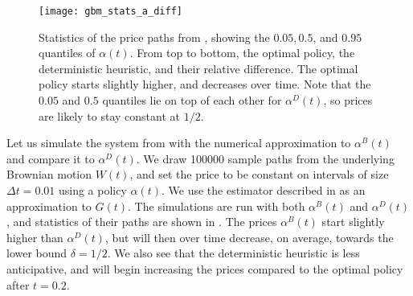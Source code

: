 \documentclass[main.tex]{subfiles}
\begin{document}
\begin{figure}[htb]
  \centering
  \texttt{[image: gbm\_stats\_a\_diff]}
  \caption[Statistics of the price paths from ]{Statistics of the price paths from
    , %
    showing the $0.05,0.5$, and
    $0.95$ quantiles of $\alpha(t)$. From top to bottom, the optimal
    policy, the deterministic heuristic, and their relative difference.
    The optimal policy starts slightly higher, and decreases over
    time.
    Note that the $0.05$ and $0.5$ quantiles lie on top of each
    other for $\alpha^D(t)$, so prices are likely to stay constant
    at $1/2$.
  }\label{fig:gbm_stats_a}
\end{figure}
\begin{example}\label{ex:impact_uncertainty}
  Let us simulate the system from
  with the numerical approximation to $\alpha^B(t)$ and compare it to $\alpha^D(t)$.
  We draw \num{100000} sample paths from the underlying Brownian
  motion $W(t)$, and set the price to be constant on intervals of size $\Delta t = 0.01$
  using a policy $\alpha(t)$. We use the estimator described in
   as an approximation to $G(t)$.
  The simulations are run with both $\alpha^B(t)$ and $\alpha^D(t)$, and
  statistics of their paths are shown in .
  The prices $\alpha^B(t)$ start slightly higher than $\alpha^D(t)$, but
  will then over time decrease, on average, towards the lower bound
  $\delta=1/2$. We also see that the deterministic heuristic is less
  anticipative, and will begin increasing the prices compared to the
  optimal policy after $t=0.2$.


\end{example}
\end{document}
